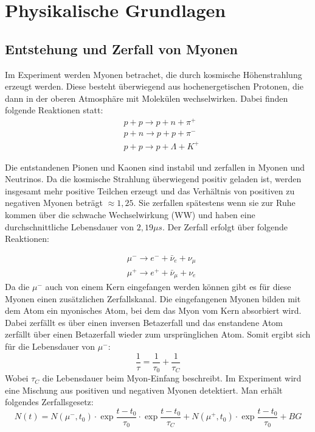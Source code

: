 \section{Physikalische Grundlagen}
\subsection{Entstehung und Zerfall von Myonen}
Im Experiment werden Myonen betrachet, die durch kosmische Höhenstrahlung erzeugt werden. Diese besteht überwiegend aus hochenergetischen Protonen, die dann in der oberen Atmosphäre mit Molekülen wechselwirken. Dabei finden folgende Reaktionen statt:
\begin{align}
	&p+p \rightarrow p+n+\pi ^{+} \\
	&p+n \rightarrow p+p+\pi ^{-}\\
	&p+p \rightarrow  p+ \Lambda + K^{+}
\end{align}

\noindent Die entstandenen Pionen und Kaonen sind instabil und zerfallen in Myonen und Neutrinos. Da die kosmische Strahlung überwiegend positiv geladen ist, werden insgesamt mehr positive Teilchen erzeugt und das Verhältnis von positiven zu negativen Myonen beträgt $\approx 1,25$. Sie zerfallen spätestens wenn sie zur Ruhe kommen über die schwache Wechselwirkung (WW) und haben eine durchschnittliche Lebensdauer von $2,19 \mu s$. Der Zerfall erfolgt über folgende Reaktionen:

\begin{align}
	&\mu ^{-} \rightarrow e^{-} + \bar{\nu} _{e} +\nu _{\mu} \\
	&\mu ^{+} \rightarrow e^{+} + \bar{\nu} _{\mu} +\nu _{e}
\end{align}
Da die $\mu ^{-}$ auch von einem Kern eingefangen werden können gibt es für diese Myonen einen zusätzlichen Zerfallskanal. Die eingefangenen Myonen bilden mit dem Atom ein myonisches Atom, bei dem das Myon vom Kern absorbiert wird. Dabei zerfällt es über einen inversen Betazerfall und das enstandene Atom zerfällt über einen Betazerfall wieder zum ursprünglichen Atom. Somit ergibt sich für die Lebensdauer von $\mu ^{-}$:
\begin{equation}
	\frac{1}{\tau} = \frac{1}{\tau _0} + \frac{1}{\tau _C}
\end{equation}
Wobei $\tau_C$ die Lebensdauer beim Myon-Einfang beschreibt.
\newline
Im Experiment wird eine Mischung aus positiven und negativen Myonen detektiert. Man erhält folgendes Zerfallsgesetz:
\begin{equation}
\label{eq:7}
	N(t)=N(\mu ^{-},t_0)\cdot \exp{\frac{t-t_0}{\tau_0}} \cdot \exp{\frac{t-t_0}{\tau_C}} + N(\mu ^{+},t_0) \cdot \exp{\frac{t-t_0}{\tau_0}}+BG
\end{equation}

